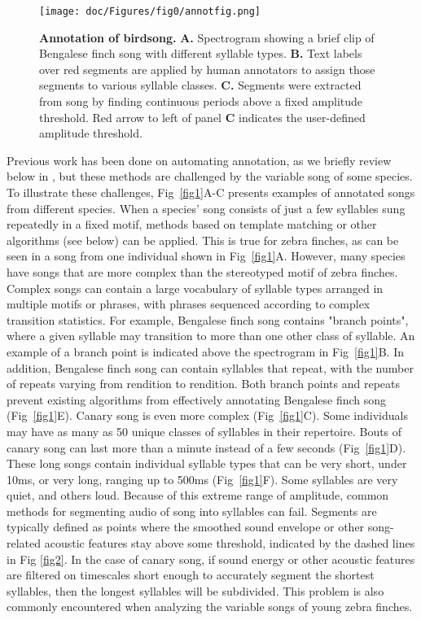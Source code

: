 \documentclass[10pt,letterpaper]{article}
\begin{document}
\begin{figure}[!h]
\texttt{[image: doc/Figures/fig0/annotfig.png]}
\caption{{\bf Annotation of birdsong.}
\textbf{A.} Spectrogram showing a brief clip of Bengalese finch song 
with different syllable types. 
\textbf{B.} Text labels over red segments are applied by human annotators to assign those segments to various syllable classes.
\textbf{C.} Segments were extracted from song by finding continuous periods above a fixed amplitude threshold.
Red arrow to left of panel \textbf{C} indicates the user-defined amplitude threshold.
}
\label{fig0}
\end{figure} 

Previous work has been done on automating annotation, 
as we briefly review below in ,
but these methods are challenged by the variable song of some species.
To illustrate these challenges,  Fig~\ref{fig1}A-C presents examples of annotated songs from different species.
When a species' song consists of just a few syllables sung repeatedly in a fixed motif, methods based on template matching or 
other algorithms (see  below) can be applied.
This is true for zebra finches, as can be seen in a song from one individual shown in Fig~\ref{fig1}A.
However, many species have songs that are more complex than the stereotyped motif of zebra finches.
Complex songs can contain a large vocabulary of syllable types arranged in multiple motifs or phrases, 
with phrases sequenced according to complex transition statistics. For example, Bengalese
finch song contains "branch points", where a given syllable may transition to more than one other class of
syllable. An example of a branch point is indicated above the spectrogram in Fig~\ref{fig1}B. In addition,
Bengalese finch song can contain syllables that repeat, with the number of repeats varying from rendition to
rendition. Both branch points and repeats prevent existing algorithms from effectively annotating Bengalese
finch song (Fig~\ref{fig1}E). Canary song is even more complex (Fig~\ref{fig1}C). Some individuals may have as many as 50 unique classes of syllables in their repertoire. Bouts of canary song can last more than a minute instead of a few seconds (Fig~\ref{fig1}D). These long songs contain individual syllable types that  can be very short, under 10ms, or very long, ranging up to 500ms (Fig~\ref{fig1}F). Some syllables are very quiet, and others loud.
Because of this extreme range of amplitude, common methods for segmenting audio of song into syllables can fail.
Segments are typically defined as points where the smoothed sound envelope or other song-related acoustic features \cite{tchernichovski_procedure_2000} stay above some threshold, indicated by the dashed lines in Fig \ref{fig2}. In the case of canary song, if sound energy or other acoustic features are filtered on timescales short enough to accurately segment the shortest syllables, then the longest syllables will be subdivided. This problem is also commonly encountered when analyzing the variable songs of young zebra finches. 
\end{document}
